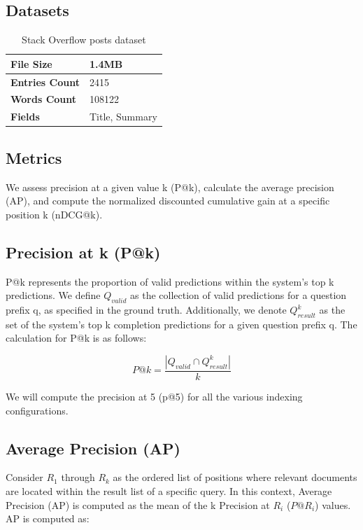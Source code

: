 {\subsection{Datasets}


\begin{table}[ht] 
{\footnotesize
\begin{tabular}{ P{3cm} ||P{10.1cm}  }      %
 \hline \hline
\textbf{File Size} & 1.4MB \T\B 
\\ 
\hline
\textbf{Entries Count} & 2415\T\B 
\\ 
\hline
\textbf{Words Count} & 108122\T\B 
\\ 
\hline
\textbf{Fields} & Title, Summary\T\B 
\\ 
\hline \hline
    \end{tabular}
}
  \captionsetup{justification=centering,margin=2cm}
  \caption{Stack Overflow posts dataset}
\end{table}

\subsection{Metrics}
We assess precision at a given value k (P@k), calculate the average precision (AP), and compute the normalized discounted cumulative gain at a specific position k (nDCG@k).

\subsection*{Precision at k (P@k)}
P@k represents the proportion of valid predictions within the system's top k predictions. We define $Q_{valid}$ as the collection of valid predictions for a question prefix q, as specified in the ground truth. Additionally, we denote $Q^k_{result}$ as the set of the system's top k completion predictions for a given question prefix q. The calculation for P@k is as follows:

\begin{equation}
P@k = \frac{|Q_{valid} \cap Q^k_{result}|}{k}
\label{eq:depth}
\end{equation}

We will compute the precision at 5 (p@5) for all the various indexing configurations.

\subsection*{Average Precision (AP)}
Consider $R_1$ through $R_k $ as the ordered list of positions where relevant documents are located within the result list of a specific query. In this context, Average Precision (AP) is computed as the mean of the k Precision at $R_i$ ($P@R_i$) values. AP is computed as:

}
